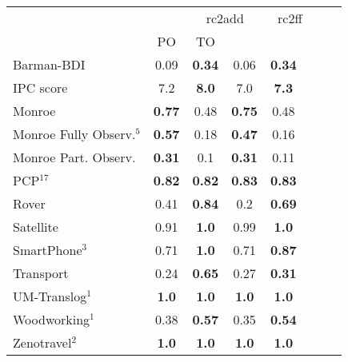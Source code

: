 \begin{tabular}{lccccccl} 
\toprule 
  && \multicolumn{2}{c}{rc2add} & \multicolumn{2}{c}{rc2ff} \\ 
\cmidrule(lr){3-4} \cmidrule(lr){5-6}  
 &PO & TO  \\ 
\midrule 
Barman-BDI & 0.09 & \textbf{0.34} & 0.06 & \textbf{0.34}  \\ 
\midrule 
 IPC score & 7.2 & \textbf{8.0} & 7.0 & \textbf{7.3}  \\ 
\midrule 
 Monroe & \textbf{0.77} & 0.48 & \textbf{0.75} & 0.48  \\ 
Monroe Fully Observ.$^{5}$ & \textbf{0.57} & 0.18 & \textbf{0.47} & 0.16  \\ 
Monroe Part. Observ. & \textbf{0.31} & 0.1 & \textbf{0.31} & 0.11  \\ 
PCP$^{17}$ & \textbf{0.82} & \textbf{0.82} & \textbf{0.83} & \textbf{0.83}  \\ 
Rover & 0.41 & \textbf{0.84} & 0.2 & \textbf{0.69}  \\ 
Satellite & 0.91 & \textbf{1.0} & 0.99 & \textbf{1.0}  \\ 
SmartPhone$^{3}$ & 0.71 & \textbf{1.0} & 0.71 & \textbf{0.87}  \\ 
Transport & 0.24 & \textbf{0.65} & 0.27 & \textbf{0.31}  \\ 
UM-Translog$^{1}$ & \textbf{1.0} & \textbf{1.0} & \textbf{1.0} & \textbf{1.0}  \\ 
Woodworking$^{1}$ & 0.38 & \textbf{0.57} & 0.35 & \textbf{0.54}  \\ 
Zenotravel$^{2}$ & \textbf{1.0} & \textbf{1.0} & \textbf{1.0} & \textbf{1.0}  \\ 
\bottomrule 
 \end{tabular} 
